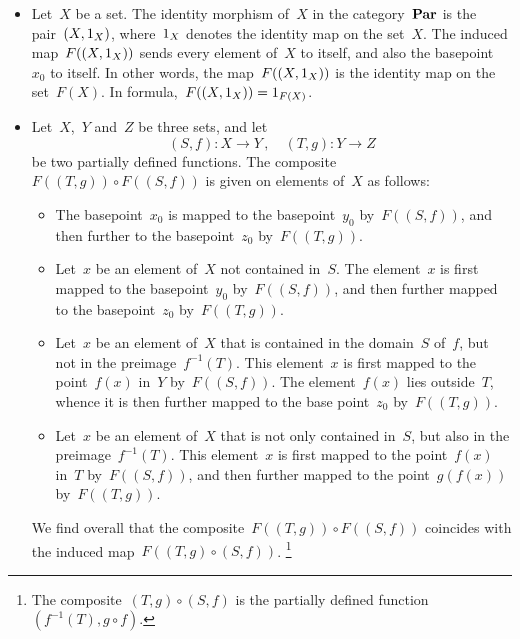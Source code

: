 \begin{itemize}

	\item
		Let~$X$ be a set.
		The identity morphism of~$X$ in the category~$\mathbf{Par}$ is the pair~$(X, 1_X)$, where~$1_X$ denotes the identity map on the set~$X$.
		The induced map~$F( (X, 1_X) )$ sends every element of~$X$ to itself, and also the basepoint~$x_0$ to itself.
		In other words, the map~$F( (X, 1_X) )$ is the identity map on the set~$F(X)$.
		In formula,~$F( (X, 1_X) ) = 1_{F(X)}$.

	\item
		Let~$X$,~$Y$ and~$Z$ be three sets, and let
		\[
			(S, f) \colon X \to Y \,,
			\quad
			(T, g) \colon Y \to Z
		\]
		be two partially defined functions.
		The composite~$F( (T, g) ) ∘ F( (S, f) )$ is given on elements of~$X$ as follows:
		\begin{itemize}

			\item
				The basepoint~$x_0$ is mapped to the basepoint~$y_0$ by~$F( (S, f) )$, and then further to the basepoint~$z_0$ by~$F( (T, g) )$.

			\item
				Let~$x$ be an element of~$X$ not contained in~$S$.
				The element~$x$ is first mapped to the basepoint~$y_0$ by~$F( (S, f) )$, and then further mapped to the basepoint~$z_0$ by~$F( (T, g) )$.

			\item
				Let~$x$ be an element of~$X$ that is contained in the domain~$S$ of~$f$, but not in the preimage~$f^{-1}(T)$.
				This element~$x$ is first mapped to the point~$f(x)$ in~$Y$ by~$F( (S, f) )$.
				The element~$f(x)$ lies outside~$T$, whence it is then further mapped to the base point~$z_0$ by~$F( (T, g) )$.

			\item
				Let~$x$ be an element of~$X$ that is not only contained in~$S$, but also in the preimage~$f^{-1}(T)$.
				This element~$x$ is first mapped to the point~$f(x)$ in~$T$ by~$F( (S, f) )$, and then further mapped to the point~$g(f(x))$ by~$F( (T, g) )$.

		\end{itemize}
		We find overall that the composite~$F( (T, g) ) ∘ F( (S, f) )$ coincides with the induced map~$F( (T, g) ∘ (S, f) )$.%
		\footnote{
			The composite~$(T, g) ∘ (S, f)$ is the partially defined function~$(f^{-1}(T), g ∘ f)$.
		}
\end{itemize}

